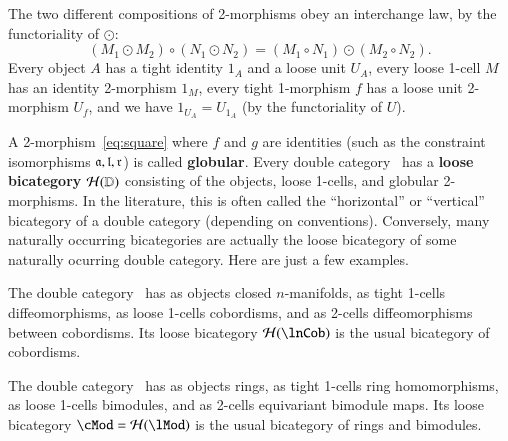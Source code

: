 The two different compositions of 2-morphisms obey an interchange law,
by the functoriality of $\odot$:
\[(M_1\odot M_2) \circ (N_1\odot N_2) = (M_1\circ N_1)\odot (M_2\circ N_2).
\]
Every object $A$ has a tight identity $1_A$ and a loose unit
$U_A$, every loose 1-cell $M$ has an identity 2-morphism $1_M$, every
tight 1-morphism $f$ has a loose unit 2-morphism $U_f$, and we
have $1_{U_A} = U_{1_A}$ (by the functoriality of $U$).



A 2-morphism~\eqref{eq:square} where $f$ and $g$ are identities (such
as the constraint isomorphisms $\mathfrak{a},\mathfrak{l},\mathfrak{r}$) is called
\textbf{globular}.  Every double category \lD\ has a
\textbf{loose bicategory} $\mathcal{H}(\mathbb{D})$ consisting of the objects,
loose 1-cells, and globular 2-morphisms.  In the literature, this is often called the ``horizontal'' or ``vertical'' bicategory of a double category (depending on conventions). Conversely, many naturally
occurring bicategories are actually the loose bicategory of some
naturally ocurring double category.  Here are just a few examples.

\begin{eg}
  The double category \lnCob\ has as objects closed $n$-manifolds, as
  tight 1-cells diffeomorphisms, as loose 1-cells cobordisms, and as
  2-cells diffeomorphisms between cobordisms.  Its loose bicategory $\cH(\lnCob)$
  is the usual bicategory of cobordisms.
\end{eg}

\begin{eg}
  The double category \lMod\ has as objects rings, as tight 1-cells ring
  homomorphisms, as loose 1-cells bimodules, and as 2-cells equivariant
  bimodule maps.  Its loose bicategory $\cMod = \cH(\lMod)$ is
  the usual bicategory of rings and bimodules. 
\end{eg}

